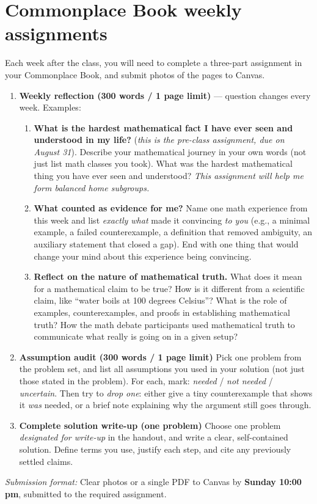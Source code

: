 \documentclass[oneside,11pt]{amsart}
\begin{document}
\section{Commonplace Book weekly assignments}

Each week after the class, 
you will need to complete a three-part assignment in your Commonplace Book,
and submit photos of the pages to Canvas.

\begin{enumerate}[(1)]
  \item
	\textbf{Weekly reflection (300 words / 1 page limit)} --- question changes 
	every week. Examples:
	\begin{enumerate}
	\item 
		\textbf{What is the hardest mathematical fact I have ever seen and understood 
		in my life?}
		(\emph{this is the pre-class assignment, due on August 31}).
		Describe your mathematical journey in your own words (not just list 
		math classes you took). What was the hardest mathematical thing you 
		have ever seen and understood? 
		\emph{This assignment will help me form balanced home subgroups.}
	\item 
		\textbf{What counted as evidence for me?}
		Name one math experience from this week
		and list \emph{exactly what} made it convincing \emph{to
		you} (e.g., a minimal example, a failed counterexample, a
		definition that removed ambiguity, an auxiliary statement
		that closed a gap). 
		End with one thing that would change your mind about 
		this experience being convincing.
	\item \textbf{Reflect on the nature of mathematical truth.}
		What does it mean for a mathematical claim to be true?
		How is it different from a scientific claim, like 
		``water boils at 100 degrees Celsius''?
		What is the role of examples, counterexamples, and proofs
		in establishing mathematical truth?
		How the math debate participants used mathematical truth to communicate 
		what really is going on in a given setup?
	\end{enumerate}

  \item \textbf{Assumption audit (300 words / 1 page limit)}
	Pick one problem from the problem set, and list all
	assumptions you used in your solution
	(not just those stated in the problem). For each, mark:
	\emph{needed} / \emph{not needed} / \emph{uncertain}. Then
	try to \emph{drop one}: either give a tiny counterexample
	that shows it \emph{was} needed, or a brief note
	explaining why the argument still goes through.

  \item \textbf{Complete solution write-up (one problem)}
  Choose one problem \emph{designated for write-up} in the handout, and write a clear, self-contained solution. Define terms you use, justify each step, and cite any previously settled claims.
\end{enumerate}
\emph{Submission format:} Clear photos or a single PDF to Canvas by \textbf{Sunday 10:00\,pm}, submitted to the required assignment.
\end{document}
